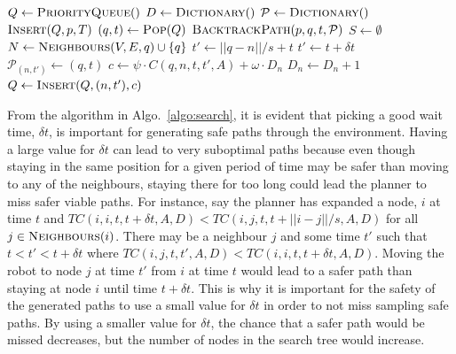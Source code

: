 \begin{algorithm}[ht]
    \caption{$\Acronym{tBestFS}(V, E, R, A, p, g, T)$}
    \label{algo:search}
    \begin{algorithmic}[1]
        \setcounter{ALC@line}{0}
        \vspace*{1mm}
        \STATE $Q \leftarrow \Function{PriorityQueue}()$
        \STATE $D \leftarrow \Function{Dictionary}()$
        \STATE $\mathcal{P} \leftarrow \Function{Dictionary}()$
        \STATE $\Function{Insert}(Q, p, T)$
            \STATE $(q, t) \leftarrow \Function{Pop}(Q)$
                \RETURN $\Function{BacktrackPath}(p, q, t, \mathcal{P})$
            \ENDIF
            \STATE $S \leftarrow \emptyset$
            \STATE $N \leftarrow \Function{Neighbours}(V, E, q) \cup \{q\}$
                    \STATE $t' \leftarrow ||q - n|| / s + t$
                \ELSE
                    \STATE $t' \leftarrow t + \delta t$
                \ENDIF
                \STATE $\mathcal{P}_{(n, t')} \leftarrow (q, t)$
                \STATE $c \leftarrow \psi \cdot C(q, n, t, t', A) + \omega
                    \cdot D_{n}$
                \STATE $D_{n} \leftarrow D_{n} + 1$
                \STATE $Q \leftarrow \Function{Insert}(Q, (n, t'), c)$
            \ENDFOR
        \ENDWHILE
    \end{algorithmic}
\end{algorithm}

From the algorithm in Algo.~\ref{algo:search}, it is evident that picking a
good wait time, $\delta t$, is important for generating safe paths through the
environment. Having a large value for $\delta t$ can lead to very suboptimal
paths because even though staying in the same position for a given period of
time may be safer than moving to any of the neighbours, staying there for too
long could lead the planner to miss safer viable paths. For instance, say the
planner has expanded a node, $i$ at time $t$ and $TC(i, i, t, t + \delta t, A,
D) < TC(i, j, t, t + ||i - j|| / s, A, D)$ for all $j \in
\Function{Neighbours}(i)$. There may be a neighbour $j$ and some time $t'$ such
that $t < t' < t + \delta t$ where $TC(i, j, t, t', A, D) < TC(i, i, t, t +
\delta t, A, D)$. Moving the robot to node $j$ at time $t'$ from $i$ at time
$t$ would lead to a safer path than staying at node $i$ until time $t + \delta
t$. This is why it is important for the safety of the generated paths to use a
small value for $\delta t$ in order to not miss sampling safe paths. By using a
smaller value for $\delta t$, the chance that a safer path would be missed
decreases, but the number of nodes in the search tree would increase.

